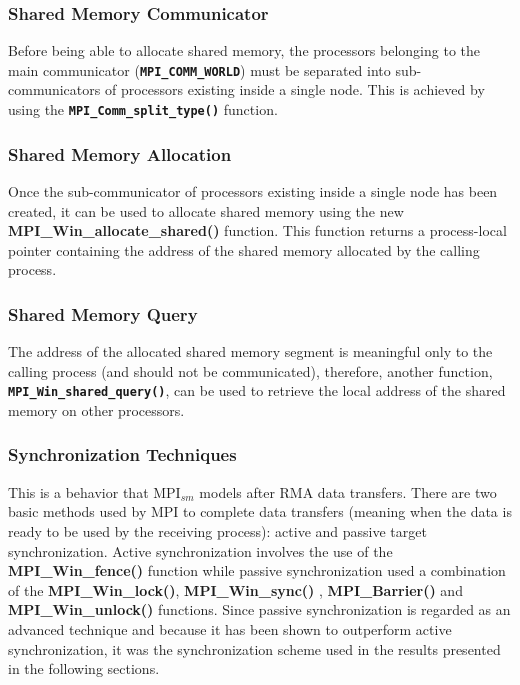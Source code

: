 \subsubsection*{Shared Memory Communicator}

Before being able to allocate shared memory, the processors belonging to the main communicator (\textbf{\texttt{MPI\_COMM\_WORLD}}) must be separated into sub-communicators of processors existing inside a single node. This is achieved by using the \textbf{\texttt{MPI\_Comm\_split\_type()}} function.

\subsubsection*{Shared Memory Allocation}

Once the sub-communicator of processors existing inside a single node has been created, it can be used to allocate shared memory using the new \textbf{MPI\_Win\_allocate\_shared()} function. This function returns a process-local pointer containing the address of the shared memory allocated by the calling process.

\subsubsection*{Shared Memory Query}

The address of the allocated shared memory segment is meaningful only to the calling process (and should not be communicated), therefore, another function, \textbf{\texttt{MPI\_Win\_shared\_query()}}, can be used to retrieve the local address of the shared memory on other processors.

\subsubsection*{Synchronization Techniques}

This is a behavior that MPI$_{sm}$ models after RMA data transfers. There are two basic methods used by MPI to complete data transfers (meaning when the data is ready to be used by the receiving process): active and passive target synchronization. Active synchronization involves the use of the \textbf{MPI\_Win\_fence()} function while passive synchronization used a combination of the \textbf{MPI\_Win\_lock()}, \textbf{MPI\_Win\_sync()} ,  \textbf{MPI\_Barrier()} and  \textbf{MPI\_Win\_unlock()} functions. Since passive synchronization is regarded as an advanced technique and because it has been shown to outperform active synchronization, it was the synchronization scheme used in the results presented in the following sections.

